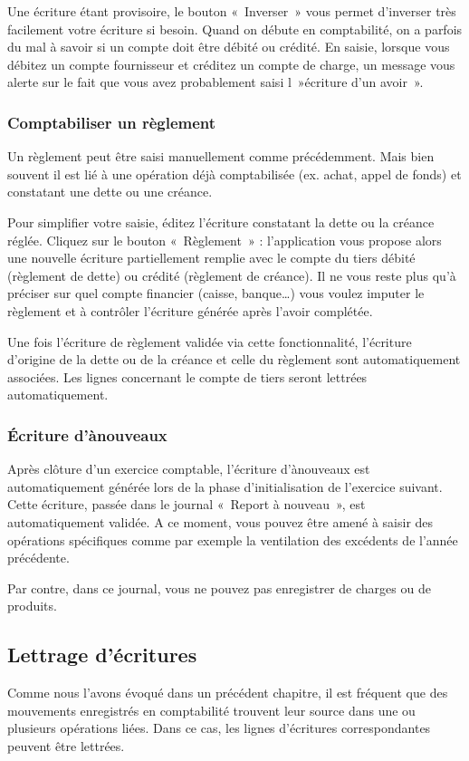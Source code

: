 \documentclass[a4paper,10pt,oneside,french]{sphinxmanual}
\begin{document}
Une écriture étant provisoire, le bouton « Inverser » vous permet d’inverser très facilement votre écriture si besoin.
Quand on débute en comptabilité, on a parfois du mal à savoir si un compte doit être débité ou crédité.
En saisie, lorsque vous débitez un compte fournisseur et créditez un compte de charge, un message vous alerte sur le fait que vous avez probablement saisi l »écriture d’un avoir ».


\subsubsection{Comptabiliser un règlement}
\label{\detokenize{accounting/entity:comptabiliser-un-reglement}}
Un règlement peut être saisi manuellement comme précédemment. Mais bien souvent il est lié à une opération déjà comptabilisée  (ex. achat, appel de fonds) et constatant une dette ou une créance.

Pour simplifier votre saisie, éditez l’écriture constatant la dette ou la créance réglée. Cliquez sur le bouton « Règlement » : l’application vous propose alors une nouvelle écriture partiellement remplie avec le compte du tiers débité (règlement de dette) ou crédité (règlement de créance).
Il ne vous reste plus qu’à préciser sur quel compte financier (caisse, banque…) vous voulez imputer le règlement et à contrôler l’écriture générée après l’avoir complétée.

Une fois l’écriture de règlement validée via cette fonctionnalité, l’écriture d’origine de la dette ou de la créance et celle du règlement sont automatiquement associées. Les lignes concernant le compte de tiers seront lettrées automatiquement.


\subsubsection{Écriture d’à\sphinxhyphen{}nouveaux}
\label{\detokenize{accounting/entity:ecriture-d-a-nouveaux}}
Après clôture d’un exercice comptable, l’écriture d’à\sphinxhyphen{}nouveaux est automatiquement générée lors de la phase d’initialisation de l’exercice suivant. Cette écriture, passée dans le journal « Report à nouveau », est automatiquement validée.
A ce moment, vous pouvez être amené à saisir des opérations spécifiques comme par exemple la ventilation des excédents de l’année précédente.

Par contre, dans ce journal, vous ne pouvez pas enregistrer de charges ou de produits.


\subsection{Lettrage d’écritures}
\label{\detokenize{accounting/entity:lettrage-d-ecritures}}
Comme nous l’avons évoqué dans un précédent chapitre, il est fréquent que des mouvements enregistrés en comptabilité trouvent leur source dans une ou plusieurs opérations liées. Dans ce cas, les lignes d’écritures correspondantes peuvent être lettrées.
\end{document}
